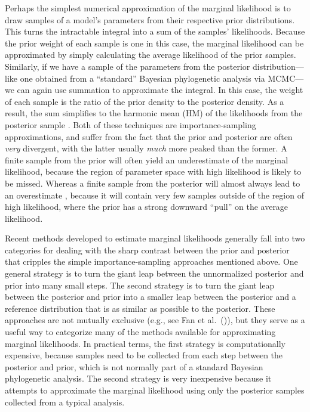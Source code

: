 Perhaps the simplest numerical approximation of the marginal likelihood is to
draw samples of a model's parameters from their respective prior distributions.
This turns the intractable integral into a sum of the samples' likelihoods.
Because the prior weight of each sample is one in this case, the marginal
likelihood can be approximated by simply calculating the average likelihood of
the prior samples.
Similarly, if we have a sample of the parameters from the posterior
distribution---like one obtained from a ``standard'' Bayesian phylogenetic
analysis via MCMC---we can again use summation to approximate the integral.
In this case, the weight of each sample is the ratio of the prior density to
the posterior density.
As a result, the sum simplifies to the harmonic mean (HM) of the likelihoods
from the posterior sample \citep{Newton1994}.
Both of these techniques are importance-sampling approximations, and suffer
from the fact that the prior and posterior are often \emph{very} divergent,
with the latter usually \emph{much} more peaked than the former.
A finite sample from the prior will often yield an underestimate of the
marginal likelihood, because the region of parameter space with high likelihood
is likely to be missed.
Whereas a finite sample from the posterior will almost always lead to an
overestimate \citep{Lartillot2006,Xie2011,Fan2011}, because it will contain
very few samples outside of the region of high likelihood, where the prior has
a strong downward ``pull'' on the average likelihood.

Recent methods developed to estimate marginal likelihoods generally fall into
two categories for dealing with the sharp contrast between the prior
and posterior that cripples the simple importance-sampling approaches
mentioned above.
One general strategy is to turn the giant leap between the unnormalized
posterior and prior into many small steps.
The second strategy is to turn the giant leap between the posterior and prior
into a smaller leap between the posterior and a reference distribution that is
as similar as possible to the posterior.
These approaches are not mutually exclusive (e.g., see Fan et al.\
(\citeyear{Fan2011})), but they serve as a useful way to categorize many of the
methods available for approximating marginal likelihoods.
In practical terms, the first strategy is computationally expensive, because
samples need to be collected from each step between the posterior and prior,
which is not normally part of a standard Bayesian phylogenetic analysis.
The second strategy is very inexpensive because it attempts to approximate the
marginal likelihood using only the posterior samples collected from a
typical analysis.


